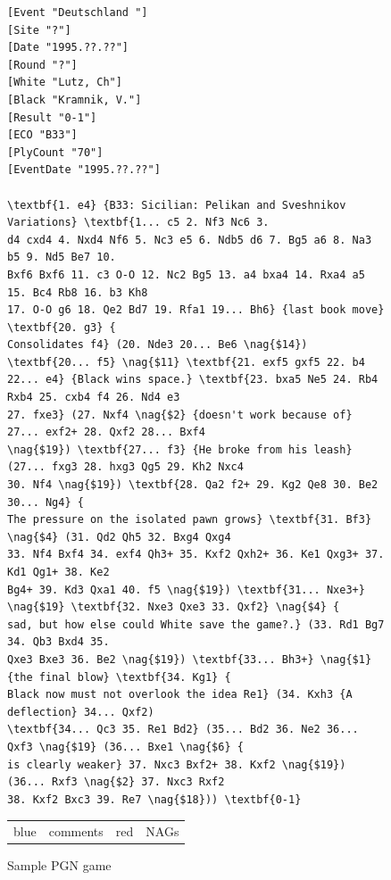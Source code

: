\documentclass[article,type=msc,colorback,accentcolor=tud7b]{tudthesis}
\begin{document}
	\begin{figure}[H]
	  \centering
	  \begin{lstlisting}	  
[Event "Deutschland "]
[Site "?"]
[Date "1995.??.??"]
[Round "?"]
[White "Lutz, Ch"]
[Black "Kramnik, V."]
[Result "0-1"]
[ECO "B33"]
[PlyCount "70"]
[EventDate "1995.??.??"]

\textbf{1. e4} {B33: Sicilian: Pelikan and Sveshnikov Variations} \textbf{1... c5 2. Nf3 Nc6 3.
d4 cxd4 4. Nxd4 Nf6 5. Nc3 e5 6. Ndb5 d6 7. Bg5 a6 8. Na3 b5 9. Nd5 Be7 10.
Bxf6 Bxf6 11. c3 O-O 12. Nc2 Bg5 13. a4 bxa4 14. Rxa4 a5 15. Bc4 Rb8 16. b3 Kh8
17. O-O g6 18. Qe2 Bd7 19. Rfa1 19... Bh6} {last book move} \textbf{20. g3} {
Consolidates f4} (20. Nde3 20... Be6 \nag{$14}) \textbf{20... f5} \nag{$11} \textbf{21. exf5 gxf5 22. b4
22... e4} {Black wins space.} \textbf{23. bxa5 Ne5 24. Rb4 Rxb4 25. cxb4 f4 26. Nd4 e3
27. fxe3} (27. Nxf4 \nag{$2} {doesn't work because of} 27... exf2+ 28. Qxf2 28... Bxf4
\nag{$19}) \textbf{27... f3} {He broke from his leash} (27... fxg3 28. hxg3 Qg5 29. Kh2 Nxc4
30. Nf4 \nag{$19}) \textbf{28. Qa2 f2+ 29. Kg2 Qe8 30. Be2 30... Ng4} {
The pressure on the isolated pawn grows} \textbf{31. Bf3} \nag{$4} (31. Qd2 Qh5 32. Bxg4 Qxg4
33. Nf4 Bxf4 34. exf4 Qh3+ 35. Kxf2 Qxh2+ 36. Ke1 Qxg3+ 37. Kd1 Qg1+ 38. Ke2
Bg4+ 39. Kd3 Qxa1 40. f5 \nag{$19}) \textbf{31... Nxe3+} \nag{$19} \textbf{32. Nxe3 Qxe3 33. Qxf2} \nag{$4} {
sad, but how else could White save the game?.} (33. Rd1 Bg7 34. Qb3 Bxd4 35.
Qxe3 Bxe3 36. Be2 \nag{$19}) \textbf{33... Bh3+} \nag{$1} {the final blow} \textbf{34. Kg1} {
Black now must not overlook the idea Re1} (34. Kxh3 {A deflection} 34... Qxf2)
\textbf{34... Qc3 35. Re1 Bd2} (35... Bd2 36. Ne2 36... Qxf3 \nag{$19} (36... Bxe1 \nag{$6} {
is clearly weaker} 37. Nxc3 Bxf2+ 38. Kxf2 \nag{$19}) (36... Rxf3 \nag{$2} 37. Nxc3 Rxf2
38. Kxf2 Bxc3 39. Re7 \nag{$18})) \textbf{0-1}
	  \end{lstlisting}	  

      \caption{Sample PGN game}
      \begin{tabular}{r@{: }l r@{: }l}
        blue & comments & red & NAGs
      \end{tabular}
      \label{fig:sample_pgn_game}
	\end{figure}
	
\end{document}
